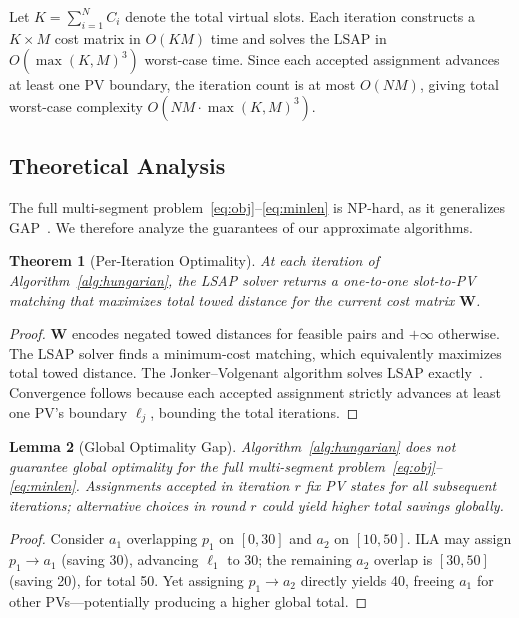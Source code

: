 \documentclass[conference]{IEEEtran}
\newtheorem{theorem}{Theorem}
\newtheorem{lemma}[theorem]{Lemma}
\begin{document}
Let $K = \sum_{i=1}^{N} C_i$ denote the total virtual slots. Each iteration constructs a $K \times M$ cost matrix in $O(KM)$ time and solves the LSAP in $O(\max(K,M)^3)$ worst-case time. Since each accepted assignment advances at least one PV boundary, the iteration count is at most $O(NM)$, giving total worst-case complexity $O(NM \cdot \max(K,M)^3)$.

\subsection{Theoretical Analysis}

The full multi-segment problem~\eqref{eq:obj}--\eqref{eq:minlen} is NP-hard, as it generalizes GAP~\cite{cattrysse1992survey}. We therefore analyze the guarantees of our approximate algorithms.

\begin{theorem}[Per-Iteration Optimality]
\label{thm:hungarian}
At each iteration of Algorithm~\ref{alg:hungarian}, the LSAP solver returns a one-to-one slot-to-PV matching that maximizes total towed distance for the current cost matrix $\mathbf{W}$.
\end{theorem}

\begin{proof}
$\mathbf{W}$ encodes negated towed distances for feasible pairs and $+\infty$ otherwise. The LSAP solver finds a minimum-cost matching, which equivalently maximizes total towed distance. The Jonker--Volgenant algorithm solves LSAP exactly~\cite{burkard2012assignment}. Convergence follows because each accepted assignment strictly advances at least one PV's boundary $\ell_j$, bounding the total iterations.
\end{proof}

\begin{lemma}[Global Optimality Gap]
\label{lem:global}
Algorithm~\ref{alg:hungarian} does not guarantee global optimality for the full multi-segment problem~\eqref{eq:obj}--\eqref{eq:minlen}. Assignments accepted in iteration $r$ fix PV states for all subsequent iterations; alternative choices in round $r$ could yield higher total savings globally.
\end{lemma}

\begin{proof}
Consider $a_1$ overlapping $p_1$ on $[0,30]$ and $a_2$ on $[10,50]$. ILA may assign $p_1 \to a_1$ (saving 30), advancing $\ell_1$ to 30; the remaining $a_2$ overlap is $[30,50]$ (saving 20), for total 50. Yet assigning $p_1 \to a_2$ directly yields 40, freeing $a_1$ for other PVs---potentially producing a higher global total.
\end{proof}
\end{document}
